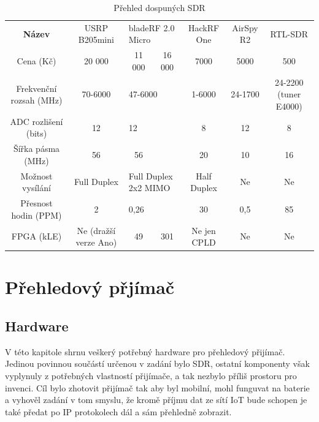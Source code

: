 \documentclass{ctuthesis}
\begin{document}
\begin{table}
\begin{ctucolortab}
\begin{tabular}{c|cccccc}
\bfseries
Název                   & USRP B205mini         & \multicolumn{2}{l}{bladeRF 2.0 Micro}    & HackRF One  & AirSpy R2 & RTL-SDR \\ \Midrule
Cena (Kč)               & 20 000                & 11 000              & 16 000             & 7000        & 5000      & 500     \\
Frekvenční rozsah (MHz) & 70-6000               & \multicolumn{2}{l}{47-6000}              & 1-6000      & 24-1700   & 24-2200 (tuner E4000) \\
ADC rozlišení (bits)    & 12                    & \multicolumn{2}{l}{12}                   & 8           & 12        & 8       \\
Šířka pásma (MHz)       & 56                    & 56                  &                    & 20          & 10        & 16      \\
Možnost vysílání        & Full Duplex           & \multicolumn{2}{l}{Full Duplex 2x2 MIMO} & Half Duplex & Ne        & Ne      \\
Přesnost hodin (PPM)    & 2                     & \multicolumn{2}{l}{0,26}                 & 30          & 0,5       & 85      \\
FPGA (kLE)              & Ne (dražší verze Ano) & 49                  & 301                & Ne jen CPLD & Ne        & Ne      \\ 
\end{tabular}
\end{ctucolortab}
\caption{Přehled dospuných SDR}
\label{tab:sdr}
\cite{etusresearch}
\cite{sdrreview2016}
\cite{itead}
\cite{sdrshowdown}
\end{table}


\part{Přehledový přjímač}
\chapter{Hardware}
V této kapitole shrnu veškerý potřebný hardware pro přehledový přijímač.\\
 Jedinou povinnou součástí určenou v zadání bylo SDR, ostatní komponenty však vyplynuly z potřebných vlastností přijímače, a tak nezbylo příliš prostoru pro invenci. Cíl bylo zhotovit přijímač tak aby byl mobilní, mohl funguvat na baterie a vyhověl zadání v tom smyslu, že kromě příjmu dat ze sítí IoT bude schopen je také předat po IP protokolech dál a sám přehledně zobrazit.
\end{document}
